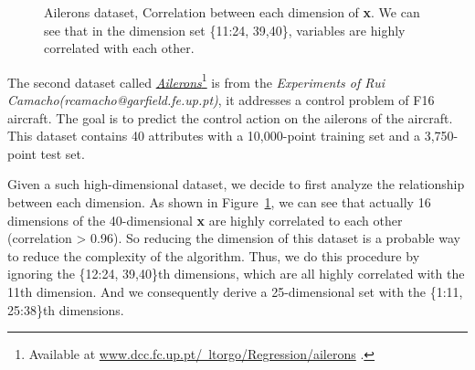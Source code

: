 \begin{figure}[htp]
\begin{minipage}[htp]{1\linewidth}
	\centering
\caption{Ailerons dataset, Correlation between each dimension of \textbf{x}. We can see that in the dimension set \{11:24, 39,40\}, variables are highly correlated with each other.}
\label{fig:data2}
\end{minipage}
\vspace{-0.05in}
\end{figure}

The second dataset called \color{blue}\href{http://www.dcc.fc.up.pt/~ltorgo/Regression/ailerons.html}{\emph{Ailerons}}\color{black}\footnote{Available at \color{blue}\href{http://www.dcc.fc.up.pt/~ltorgo/Regression/ailerons.html}{www.dcc.fc.up.pt/~ltorgo/Regression/ailerons} \color{black}.}
is from the \emph{Experiments of Rui Camacho(rcamacho@garfield.fe.up.pt)}, it addresses a control problem of F16 aircraft. The goal is to predict the control action on the ailerons of the aircraft.
This dataset contains 40 attributes with a 10,000-point training set and a 3,750-point test set.

Given a such high-dimensional dataset, we decide to first analyze the relationship between each dimension.
As shown in Figure~\ref{fig:data2}, we can see that actually 16 dimensions of the 40-dimensional \textbf{x} are highly correlated to each other (correlation > 0.96).
So reducing the dimension of this dataset is a probable way to reduce the complexity of the algorithm.
Thus, we do this procedure by ignoring the \{12:24, 39,40\}th dimensions, which are all highly correlated with the 11th dimension. And we consequently derive a 25-dimensional set with the \{1:11, 25:38\}th dimensions. \\

